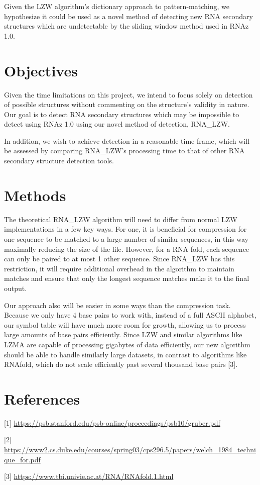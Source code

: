 \documentclass[letterpaper, 12pt]{artikel3}
\begin{document}
Given the LZW algorithm's dictionary approach to pattern-matching, we hypothesize it could be used as a novel method of detecting new RNA secondary structures which are undetectable by the sliding window method used in RNAz 1.0. 

\vspace{-10mm}
\section*{Objectives}
Given the time limitations on this project, we intend to focus solely on detection of possible structures without commenting on the structure's validity in nature.  Our goal is to detect RNA secondary structures which may be impossible to detect using RNAz 1.0 using our novel method of detection, RNA\_LZW. 

In addition, we wish to achieve detection in a reasonable time frame, which will be assessed by comparing RNA\_LZW's processing time to that of other RNA secondary structure detection tools. 

\vspace{-10mm}
\section*{Methods}

The theoretical RNA\_LZW algorithm will need to differ from normal LZW implementations in a few key ways. For one, it is beneficial for compression for one sequence to be matched to a large number of similar sequences, in this way maximally reducing the size of the file. However, for a RNA fold, each sequence can only be paired to at most 1 other sequence. Since RNA\_LZW has this restriction, it will require additional overhead in the algorithm to maintain matches and ensure that only the longest sequence matches make it to the final output. 

Our approach also will be easier in some ways than the compression task. Because we only have 4 base pairs to work with, instead of a full ASCII alphabet, our symbol table will have much more room for growth, allowing us to process large amounts of base pairs efficiently. Since LZW and similar algorithms like LZMA are capable of processing gigabytes of data efficiently, our new algorithm should be able to handle similarly large datasets, in contrast to algorithms like RNAfold, which do not scale efficiently past several thousand base pairs [3].

\section*{References}

[1] \url{https://psb.stanford.edu/psb-online/proceedings/psb10/gruber.pdf}

[2] \url{https://www2.cs.duke.edu/courses/spring03/cps296.5/papers/welch_1984_technique_for.pdf}

[3] \url{https://www.tbi.univie.ac.at/RNA/RNAfold.1.html}
\end{document}
